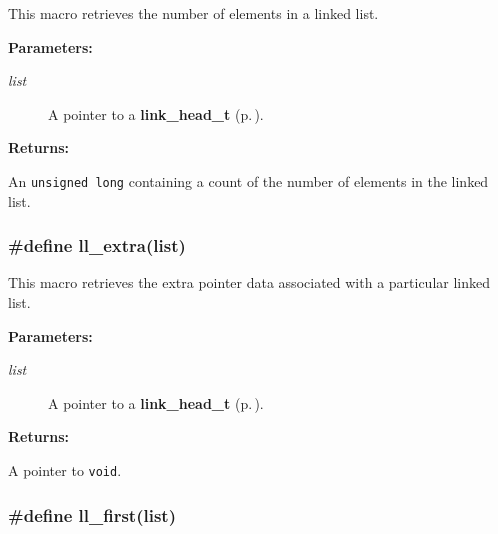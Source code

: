  This macro retrieves the number of elements in a linked list.\begin{Desc}
\item[{\bf Parameters: }]\par
\begin{description}
\item[
{\em list}]A pointer to a {\bf link\_\-head\_\-t} {\rm (p.\,\pageref{group__dbprim__link_a0})}.

\end{description}
\end{Desc}
\begin{Desc}
\item[{\bf Returns: }]\par
An {\tt unsigned long} containing a count of the number of elements in the linked list. \end{Desc}
\subsubsection{\setlength{\rightskip}{0pt plus 5cm}\#define ll\_\-extra(list)}\label{group__dbprim__link_a18}




 This macro retrieves the extra pointer data associated with a particular linked list.\begin{Desc}
\item[{\bf Parameters: }]\par
\begin{description}
\item[
{\em list}]A pointer to a {\bf link\_\-head\_\-t} {\rm (p.\,\pageref{group__dbprim__link_a0})}.

\end{description}
\end{Desc}
\begin{Desc}
\item[{\bf Returns: }]\par
A pointer to {\tt void}. \end{Desc}
\subsubsection{\setlength{\rightskip}{0pt plus 5cm}\#define ll\_\-first(list)}\label{group__dbprim__link_a16}




